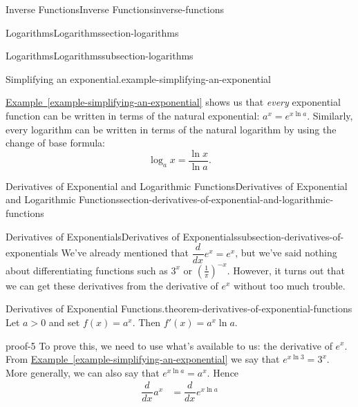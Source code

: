 \documentclass[oneside,10pt,]{book}
\numberwithin{equation}{section}
\newcommand{\dv}[3][]{\dfrac{d^{#1} #2}{d #3^{#1}}}
\begin{document}
\begin{chapterptx}{Inverse Functions}{}{Inverse Functions}{}{}{inverse-functions}
\begin{sectionptx}{Logarithms}{}{Logarithms}{}{}{section-logarithms}
\begin{subsectionptx}{Logarithms}{}{Logarithms}{}{}{subsection-logarithms}
\begin{example}{Simplifying an exponential.}{example-simplifying-an-exponential}
%
\end{example}
\hypertarget{p-225}{}%
\hyperref[example-simplifying-an-exponential]{Example~\ref{example-simplifying-an-exponential}} shows us that \emph{every} exponential function can be written in terms of the natural exponential: \(a^{x} = e^{x\ln a}\). Similarly, every logarithm can be written in terms of the natural logarithm by using the change of base formula:%
\begin{equation*}
\log_{a}x = \frac{\ln x}{\ln a}.
\end{equation*}
%
\end{subsectionptx}
\end{sectionptx}
%
%
\typeout{************************************************}
\typeout{************************************************}
%
\begin{sectionptx}{Derivatives of Exponential and Logarithmic Functions}{}{Derivatives of Exponential and Logarithmic Functions}{}{}{section-derivatives-of-exponential-and-logarithmic-functions}
%
%
\typeout{************************************************}
\typeout{************************************************}
%
\begin{subsectionptx}{Derivatives of Exponentials}{}{Derivatives of Exponentials}{}{}{subsection-derivatives-of-exponentials}
\hypertarget{p-226}{}%
We've already mentioned that \(\dv{}{x}e^{x} = e^{x}\), but we've said nothing about differentiating functions such as \(3^{x}\) or \((\frac{1}{\pi})^{-x}\). However, it turns out that we can get these derivatives from the derivative of \(e^{x}\) without too much trouble.%
\begin{theorem}{Derivatives of Exponential Functions.}{}{theorem-derivatives-of-exponential-functions}%
\hypertarget{p-227}{}%
Let \(a > 0\) and set \(f(x) = a^{x}\). Then \(f'(x) = a^{x}\ln a\).%
\end{theorem}
\begin{proofptx}{}{proof-5}
\hypertarget{p-228}{}%
To prove this, we need to use what's available to us: the derivative of \(e^{x}\). From \hyperref[example-simplifying-an-exponential]{Example~\ref{example-simplifying-an-exponential}} we say that \(e^{x\ln 3} = 3^{x}\). More generally, we can also say that \(e^{x\ln a} = a^{x}\). Hence%
\begin{align*}
\dv{}{x}a^{x} & = \dv{}{x}e^{x\ln a} \\

\end{align*}
\end{proofptx}
\end{subsectionptx}
\end{sectionptx}
\end{chapterptx}
\end{document}
